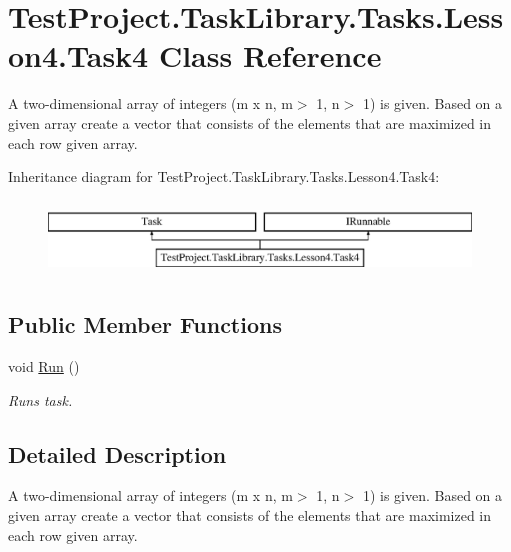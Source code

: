 \hypertarget{class_test_project_1_1_task_library_1_1_tasks_1_1_lesson4_1_1_task4}{}\section{Test\+Project.\+Task\+Library.\+Tasks.\+Lesson4.\+Task4 Class Reference}
\label{class_test_project_1_1_task_library_1_1_tasks_1_1_lesson4_1_1_task4}


A two-\/dimensional array of integers (m x n, m$>$ 1, n$>$ 1) is given. Based on a given array create a vector that consists of the elements that are maximized in each row given array.  


Inheritance diagram for Test\+Project.\+Task\+Library.\+Tasks.\+Lesson4.\+Task4\+:\begin{figure}[H]
\begin{center}
\leavevmode
\includegraphics[height=2.000000cm]{class_test_project_1_1_task_library_1_1_tasks_1_1_lesson4_1_1_task4}
\end{center}
\end{figure}
\subsection*{Public Member Functions}
\begin{DoxyCompactItemize}
\item 
void \mbox{\hyperlink{class_test_project_1_1_task_library_1_1_tasks_1_1_lesson4_1_1_task4_a28ae5c4fe1bd36fbf6107fbd51e66f74}{Run}} ()
\begin{DoxyCompactList}\small\item\em Runs task. \end{DoxyCompactList}\end{DoxyCompactItemize}


\subsection{Detailed Description}
A two-\/dimensional array of integers (m x n, m$>$ 1, n$>$ 1) is given. Based on a given array create a vector that consists of the elements that are maximized in each row given array. 



